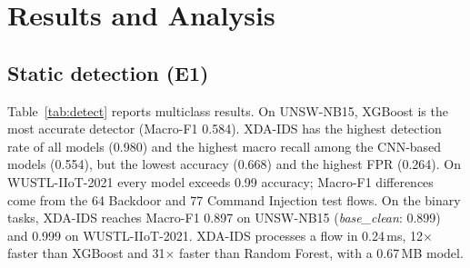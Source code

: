 \documentclass[conference]{IEEEtran}
\begin{document}
\section{Results and Analysis}\label{sec:results}
\subsection{Static detection (E1)}
Table~\ref{tab:detect} reports multiclass results. On UNSW-NB15, XGBoost is the most accurate detector (Macro-F1 0.584). XDA-IDS has the highest detection rate of all models (0.980) and the highest macro recall among the CNN-based models (0.554), but the lowest accuracy (0.668) and the highest FPR (0.264). On WUSTL-IIoT-2021 every model exceeds 0.99 accuracy; Macro-F1 differences come from the 64 Backdoor and 77 Command Injection test flows. On the binary tasks, XDA-IDS reaches Macro-F1 0.897 on UNSW-NB15 (\textit{base\_clean}: 0.899) and 0.999 on WUSTL-IIoT-2021. XDA-IDS processes a flow in 0.24\,ms, 12$\times$ faster than XGBoost and 31$\times$ faster than Random Forest, with a 0.67\,MB model.
\end{document}
